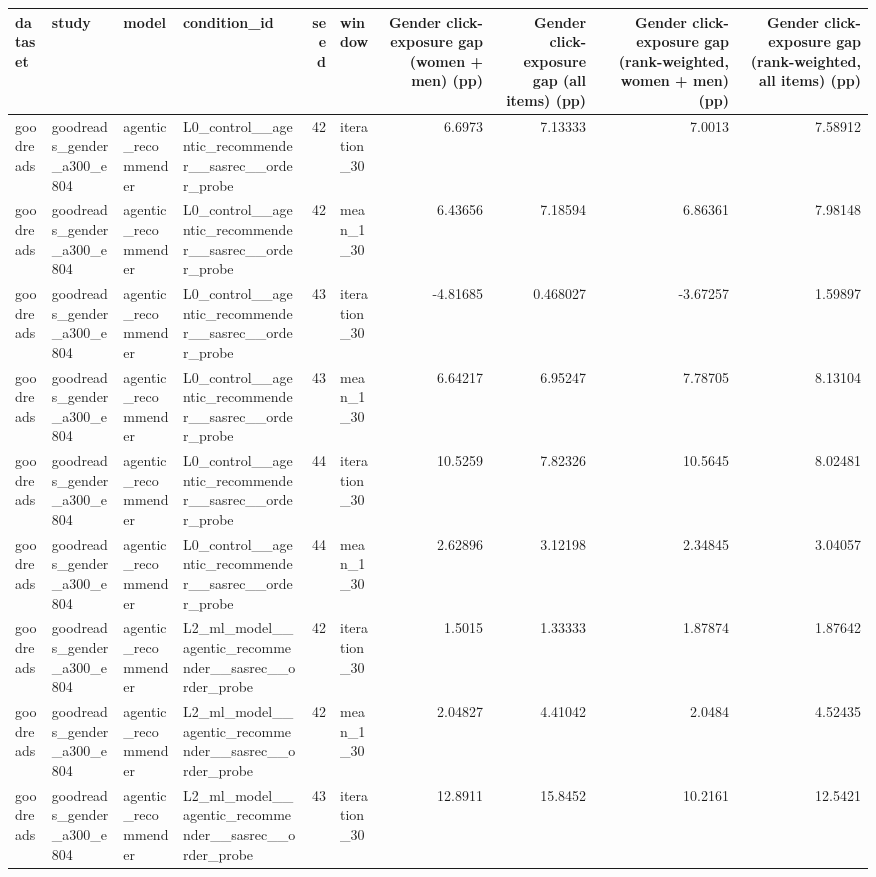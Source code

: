 \begin{table}[htbp!]
\centering
\small
\setlength{\tabcolsep}{3pt}
\renewcommand{\arraystretch}{1.1}
\begin{tabular}{llllrlrrrr}
\hline
dataset & study & model & condition\_id & seed & window & Gender click-exposure gap (women + men) (pp) & Gender click-exposure gap (all items) (pp) & Gender click-exposure gap (rank-weighted, women + men) (pp) & Gender click-exposure gap (rank-weighted, all items) (pp) \\
\hline
goodreads & goodreads\_gender\_a300\_e804 & agentic\_recommender & L0\_control\_\_agentic\_recommender\_\_sasrec\_\_order\_probe & 42 & iteration\_30 & 6.6973 & 7.13333 & 7.0013 & 7.58912 \\
goodreads & goodreads\_gender\_a300\_e804 & agentic\_recommender & L0\_control\_\_agentic\_recommender\_\_sasrec\_\_order\_probe & 42 & mean\_1\_30 & 6.43656 & 7.18594 & 6.86361 & 7.98148 \\
goodreads & goodreads\_gender\_a300\_e804 & agentic\_recommender & L0\_control\_\_agentic\_recommender\_\_sasrec\_\_order\_probe & 43 & iteration\_30 & -4.81685 & 0.468027 & -3.67257 & 1.59897 \\
goodreads & goodreads\_gender\_a300\_e804 & agentic\_recommender & L0\_control\_\_agentic\_recommender\_\_sasrec\_\_order\_probe & 43 & mean\_1\_30 & 6.64217 & 6.95247 & 7.78705 & 8.13104 \\
goodreads & goodreads\_gender\_a300\_e804 & agentic\_recommender & L0\_control\_\_agentic\_recommender\_\_sasrec\_\_order\_probe & 44 & iteration\_30 & 10.5259 & 7.82326 & 10.5645 & 8.02481 \\
goodreads & goodreads\_gender\_a300\_e804 & agentic\_recommender & L0\_control\_\_agentic\_recommender\_\_sasrec\_\_order\_probe & 44 & mean\_1\_30 & 2.62896 & 3.12198 & 2.34845 & 3.04057 \\
goodreads & goodreads\_gender\_a300\_e804 & agentic\_recommender & L2\_ml\_model\_\_agentic\_recommender\_\_sasrec\_\_order\_probe & 42 & iteration\_30 & 1.5015 & 1.33333 & 1.87874 & 1.87642 \\
goodreads & goodreads\_gender\_a300\_e804 & agentic\_recommender & L2\_ml\_model\_\_agentic\_recommender\_\_sasrec\_\_order\_probe & 42 & mean\_1\_30 & 2.04827 & 4.41042 & 2.0484 & 4.52435 \\
goodreads & goodreads\_gender\_a300\_e804 & agentic\_recommender & L2\_ml\_model\_\_agentic\_recommender\_\_sasrec\_\_order\_probe & 43 & iteration\_30 & 12.8911 & 15.8452 & 10.2161 & 12.5421 \\

\end{tabular}
\end{table}

